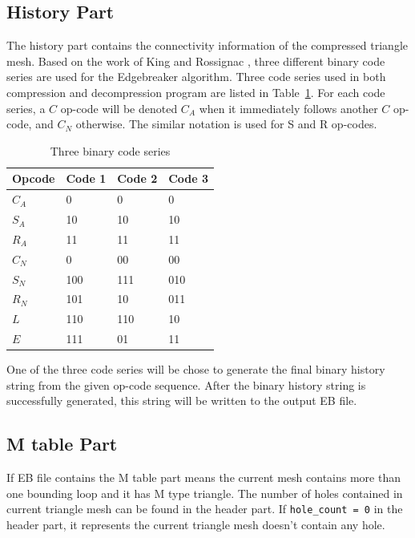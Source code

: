 \documentclass[onecolumn, 12pt]{article}
\begin{document}
\subsection{History Part}
The history part contains the connectivity information of the compressed triangle mesh. Based on the work of King and Rossignac \cite{3.67v}, three different binary code series are used for the Edgebreaker algorithm. Three code series used in both compression and decompression program are listed in Table~\ref{tab:codeSeries}. For each code series, a $C$ op-code will be denoted $C_A$ when it immediately follows another $C$ op-code, and $C_N$ otherwise. The similar notation is used for S and R op-codes.

\begin{table}[h]
\normalsize
\centering
\caption{Three binary code series}
  \begin{tabular}{ | p{} | p{} | p{} | p{} | }
    \hline
    Opcode & Code 1 & Code 2 & Code 3 \\
    \hline
    $C_A$ & 0 & 0 & 0 \\
    \hline
    $S_A$ & 10 & 10 & 10 \\
    \hline
    $R_A$ & 11 & 11 & 11 \\
    \hline
    \hline
    $C_N$ & 0 & 00 & 00 \\
    \hline
    $S_N$ & 100 & 111 & 010 \\
    \hline
    $R_N$ & 101 & 10 & 011 \\
    \hline
    $L$ & 110 & 110 & 10 \\
    \hline
    $E$ & 111 & 01 & 11 \\
    \hline
    \hline
  \end{tabular}
  \label{tab:codeSeries}
\end{table}

One of the three code series will be chose to generate the final binary history string from the given op-code sequence. After the binary history string is successfully generated, this string will be written to the output EB file.



\subsection{M table Part}
If EB file contains the M table part means the current mesh contains more than one bounding loop and it has M type triangle. The number of holes contained in current triangle mesh can be found in the header part. If \lstinline !hole_count = 0! in the header part, it represents the current triangle mesh doesn't contain any hole.
\end{document}
